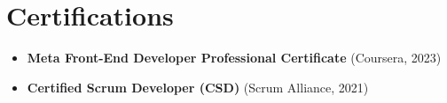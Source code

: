\section{Certifications}
\begin{itemize}[leftmargin=*, noitemsep]
    \item \textbf{Meta Front-End Developer Professional Certificate} (Coursera, 2023)
    \item \textbf{Certified Scrum Developer (CSD)} (Scrum Alliance, 2021)
\end{itemize}
